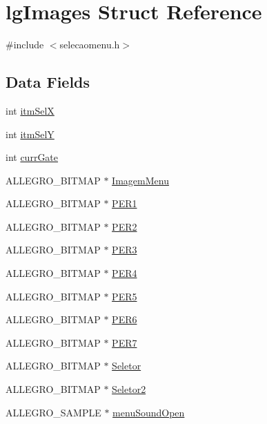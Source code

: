 \hypertarget{structlg_images}{\section{lg\-Images Struct Reference}
\label{structlg_images}
}


{\ttfamily \#include $<$selecaomenu.\-h$>$}

\subsection*{Data Fields}
\begin{DoxyCompactItemize}
\item 
int \hyperlink{structlg_images_a80e20539c9ee783d1b94d9ff45b84285}{itm\-Sel\-X}
\item 
int \hyperlink{structlg_images_a419148a94eb987b22532c4cafda281f3}{itm\-Sel\-Y}
\item 
int \hyperlink{structlg_images_a2c7659050a9602d2f1d03ba7ba5e1ab1}{curr\-Gate}
\item 
A\-L\-L\-E\-G\-R\-O\-\_\-\-B\-I\-T\-M\-A\-P $\ast$ \hyperlink{structlg_images_a1dd6f6bab3c44a483fd6b0ec167bef6e}{Imagem\-Menu}
\item 
A\-L\-L\-E\-G\-R\-O\-\_\-\-B\-I\-T\-M\-A\-P $\ast$ \hyperlink{structlg_images_afbf7d912689bf672658e2196ba1c36a1}{P\-E\-R1}
\item 
A\-L\-L\-E\-G\-R\-O\-\_\-\-B\-I\-T\-M\-A\-P $\ast$ \hyperlink{structlg_images_a8b18e2d20f8b610e44bc273533843b47}{P\-E\-R2}
\item 
A\-L\-L\-E\-G\-R\-O\-\_\-\-B\-I\-T\-M\-A\-P $\ast$ \hyperlink{structlg_images_a2a5acaeabc1157693a8fb90858bf8c92}{P\-E\-R3}
\item 
A\-L\-L\-E\-G\-R\-O\-\_\-\-B\-I\-T\-M\-A\-P $\ast$ \hyperlink{structlg_images_ac7ed3922422519caecb1441e0e47f9f5}{P\-E\-R4}
\item 
A\-L\-L\-E\-G\-R\-O\-\_\-\-B\-I\-T\-M\-A\-P $\ast$ \hyperlink{structlg_images_a128effb8f487de492fe834f0dc787bbc}{P\-E\-R5}
\item 
A\-L\-L\-E\-G\-R\-O\-\_\-\-B\-I\-T\-M\-A\-P $\ast$ \hyperlink{structlg_images_ac887b2602b833b8b666118bd6d567072}{P\-E\-R6}
\item 
A\-L\-L\-E\-G\-R\-O\-\_\-\-B\-I\-T\-M\-A\-P $\ast$ \hyperlink{structlg_images_a1c853dd3f6fd593433dfa8fc05e169db}{P\-E\-R7}
\item 
A\-L\-L\-E\-G\-R\-O\-\_\-\-B\-I\-T\-M\-A\-P $\ast$ \hyperlink{structlg_images_a1649a8fab3f526dc3c6668535fdb6a97}{Seletor}
\item 
A\-L\-L\-E\-G\-R\-O\-\_\-\-B\-I\-T\-M\-A\-P $\ast$ \hyperlink{structlg_images_a3098e23d8e3339d84485ad715e4e638a}{Seletor2}
\item 
A\-L\-L\-E\-G\-R\-O\-\_\-\-S\-A\-M\-P\-L\-E $\ast$ \hyperlink{structlg_images_a4281ee5c3e4bde427f0549271dcf92e9}{menu\-Sound\-Open}
\end{DoxyCompactItemize}


